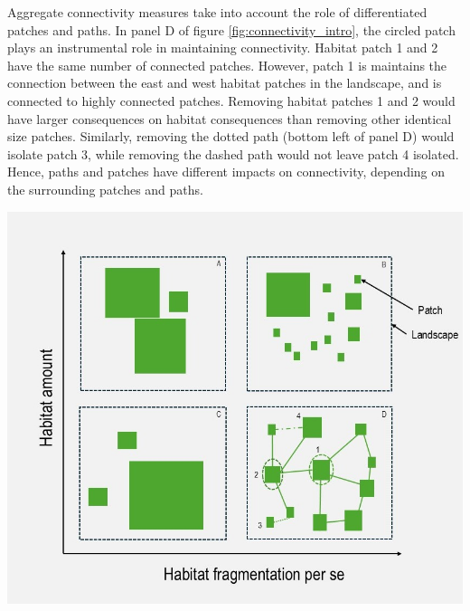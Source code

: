 \begin{tcolorbox}[breakable, 
colback =verylightgray, 
colframe=gray!75!black,
title={Box 2 - Habitat Loss, Fragmentation and Connectivity},
fontupper=\small]
 Aggregate connectivity measures take into account the role of differentiated patches and paths. In panel D of figure \ref{fig:connectivity_intro}, the circled patch plays an instrumental role in maintaining connectivity. Habitat patch 1 and 2 have the same number of connected patches. However, patch 1 is maintains the connection between the east and west habitat patches in the landscape, and is connected to highly connected patches. Removing habitat patches 1 and 2 would have larger consequences on habitat consequences than removing other identical size patches. Similarly, removing the dotted path (bottom left of panel D) would isolate patch 3, while removing the dashed path would not leave patch 4 isolated. Hence, paths and patches have different impacts on connectivity, depending on the surrounding patches and paths.
\\%
\begin{center}
\includegraphics[width = .8\textwidth]{figures/intro/fragmentation.jpg}
\label{fig:connectivity_intro}
\end{center}
\end{tcolorbox}
	
